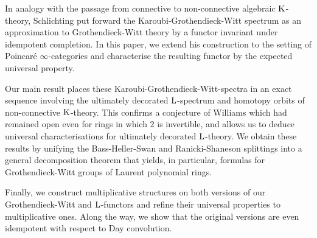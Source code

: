 In analogy with the passage from connective to non-connective algebraic $\operatorname K$-theory, Schlichting put forward the Karoubi-Grothendieck-Witt spectrum as an approximation to Grothendieck-Witt theory by a functor invariant under idempotent completion. In this paper, we extend his construction to the setting of Poincaré $\infty$-categories and characterise the resulting functor by the expected universal property.

Our main result places these Karoubi-Grothendieck-Witt-spectra in an exact sequence involving the ultimately decorated $\operatorname L$-spectrum and homotopy orbits of non-connective $\operatorname K$-theory. This confirms a conjecture of Williams which had remained open even for rings in which $2$ is invertible, and allows us to deduce universal characterisations for ultimately decorated $\operatorname L$-theory. We obtain these results by unifying the Bass-Heller-Swan and Ranicki-Shaneson splittings into a general decomposition theorem that yields, in particular, formulas for Grothendieck-Witt groups of Laurent polynomial rings.

Finally, we construct multiplicative structures on both versions of our Grothendieck-Witt and $\operatorname L$-functors and refine their universal properties to multiplicative ones. Along the way, we show that the original versions are even idempotent with respect to Day convolution.


































